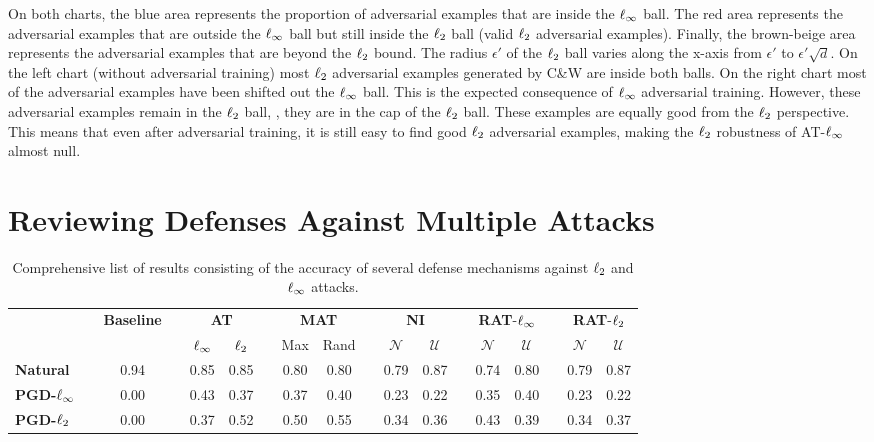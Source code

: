 On both charts, the blue area represents the proportion of adversarial examples that are inside the $\ell_\infty $ ball.
The red area represents the adversarial examples that are outside the $\ell_\infty $ ball but still inside the $\ell_2 $ ball (valid $\ell_2 $ adversarial examples).
Finally, the brown-beige area represents the adversarial examples that are beyond the $\ell_2 $ bound.
The radius $\epsilon'$ of the $\ell_2 $ ball varies along the x-axis from $\epsilon'$ to $\epsilon' \sqrt{d}$.
On the left chart (without adversarial training) most $\ell_2 $ adversarial examples generated by C\&W are inside both balls.
On the right chart most of the adversarial examples have been shifted out the $\ell_\infty $ ball.
This is the expected consequence of $\ell_\infty $ adversarial training.
However, these adversarial examples remain in the $\ell_2 $ ball, \ie, they are in the cap of the $\ell_2 $ ball.
These examples are equally good from the $\ell_2 $ perspective.
This means that even after adversarial training, it is still easy to find good $\ell_2 $ adversarial examples, making the $\ell_2 $ robustness of AT-$\ell_\infty $ almost null. 

\section{Reviewing Defenses Against Multiple Attacks}
\label{section:ap4-reviewing_defenses_against_multiple_attacks}

\begin{table}[ht]
  \centering
  \tabcolsep=0.13cm
  {\small
  \begin{tabular}{lccccccccccccccccc}
    \toprule
     & & \multirow{2}{*}{\textbf{Baseline}} & & \multicolumn{2}{c}{\textbf{AT}} & & \multicolumn{2}{c}{\textbf{MAT}} & & \multicolumn{2}{c}{\textbf{NI}} & & \multicolumn{2}{c}{\textbf{RAT}-$\ell_\infty $} & & \multicolumn{2}{c}{\textbf{RAT}-$\ell_2 $} \\
    \cmidrule{5-6} \cmidrule{8-9} \cmidrule{11-12} \cmidrule{14-15} \cmidrule{17-18}
     & & & & $\ell_\infty $ & $\ell_2 $ &   & Max & Rand &   & $\mathcal{N}$ & $\mathcal{U}$ &   & $\mathcal{N}$ & $\mathcal{U}$ &   & $\mathcal{N}$ & $\mathcal{U}$ \\
    \midrule
    \textbf{Natural}     &   & 0.94 &   & 0.85 & 0.85 &   & 0.80 & 0.80 &   & 0.79 & 0.87 &   & 0.74 & 0.80 &   & 0.79 & 0.87 \\
    \textbf{PGD-$\ell_\infty $} &   & 0.00 &   & 0.43 & 0.37 &   & 0.37 & 0.40 &   & 0.23 & 0.22 &   & 0.35 & 0.40 &   & 0.23 & 0.22 \\
    \textbf{PGD-$\ell_2 $} &   & 0.00 &   & 0.37 & 0.52 &   & 0.50 & 0.55 &   & 0.34 & 0.36 &   & 0.43 & 0.39 &   & 0.34 & 0.37 \\
    \bottomrule
  \end{tabular}%
  }
  \caption{Comprehensive list of results consisting of the accuracy of several defense mechanisms against $\ell_2 $ and $\ell_\infty $ attacks.}
  \label{table:ap4-results}
\end{table}%


